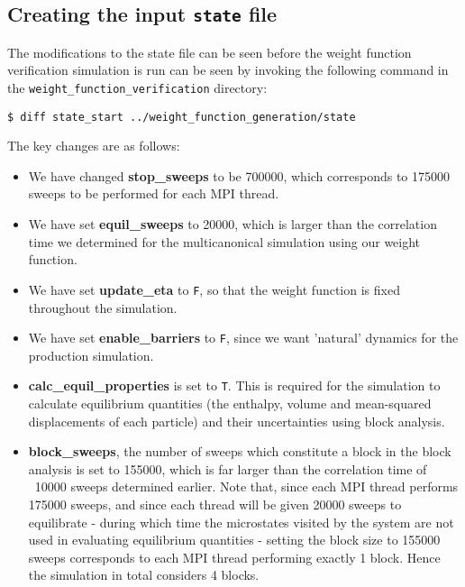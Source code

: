 \documentclass{report}
\begin{document}
\subsection{Creating the input \texttt{state} file}
The modifications to the state file can be seen before the weight function verification simulation is run can be seen by invoking the following command
in the \texttt{weight\_function\_verification} directory:
\begin{verbatim}
$ diff state_start ../weight_function_generation/state
\end{verbatim}
The key changes are as follows:
\begin{itemize}
\item We have changed \textbf{stop\_sweeps} to be 700000, which corresponds to 175000 sweeps to be performed for each MPI thread.
\item We have set \textbf{equil\_sweeps} to 20000, which is larger than the correlation time we determined for the multicanonical simulation using our 
weight function.
\item We have set \textbf{update\_eta} to \texttt{F}, so that the weight function is fixed throughout the simulation.
\item We have set \textbf{enable\_barriers} to \texttt{F}, since we want 'natural' dynamics for the production simulation.
\item \textbf{calc\_equil\_properties} is set to \texttt{T}. This is required for the simulation to calculate equilibrium quantities (the enthalpy, volume and 
mean-squared displacements of each particle) and their uncertainties using block analysis.
\item \textbf{block\_sweeps}, the number of sweeps which constitute a block in the block analysis is set to 155000, which is far larger than the 
correlation time of
  ~10000 sweeps determined earlier. Note that, since each MPI thread performs 175000 sweeps, and since each thread will be given 20000 sweeps to 
  equilibrate - during which time the microstates visited by the system are not used in evaluating equilibrium quantities - setting the block size to 
  155000 sweeps corresponds to each MPI thread performing exactly 1 block. Hence the simulation in total considers 4 blocks.
\end{itemize}
\end{document}
